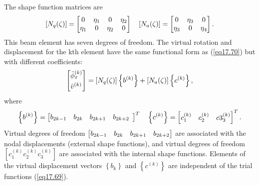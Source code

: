 \documentclass{AeroStructure-ERJohnson}
\begin{document}
The shape function matrices are
\begin{align}\label{eq17.72}
\left[N_{q}(\zeta)\right]=\left[\begin{array}{@{}cccc@{}}0 & \eta_{1} & 0 & \eta_{2} \\\eta_{1} & 0 & \eta_{2} & 0\end{array}\right] \quad\left[N_{a}(\zeta)\right]=\left[\begin{array}{@{}ccc@{}}0 & \eta_{3} & 0 \\\eta_{3} & 0 & \eta_{4}\end{array}\right].
\end{align}
This beam element has seven degrees of freedom. The virtual rotation and displacement for the kth element have the same functional form as (\ref{eq17.70}) but with different coefficients:
\begin{align}\label{eq17.73}
\left[\begin{array}{@{}l@{}}\bar{\phi}_{x}^{(k)} \\[3pt]\bar{v}^{(k)}\end{array}\right]=\left[N_{q}(\zeta)\right]\left\{b^{(k)}\right\}+\left[N_{a}(\zeta)\right]\left\{c^{(k)}\right\},
\end{align}
where
\begin{align}\label{eq17.74}
\left\{b^{(k)}\right\}=\left[\begin{array}{@{}lllll@{}}b_{2 k-1} & b_{2 k} & b_{2 k+1} & b_{2 k+2}\end{array}\right]^{T} \quad\left\{c^{(k)}\right\}=\left[\begin{array}{@{}lll@{}}c_{1}^{(k)} & c_{2}^{(k)} & c 3_{3}^{(k)}\end{array}\right]^{T}.
\end{align}
Virtual degrees of freedom $\left[\begin{array}{@{}llll@{}}b_{2 k-1} & b_{2 k} & b_{2 k+1} & b_{2 k+2}\end{array}\right]$ are associated with the nodal displacements (external shape functions), and virtual degrees of freedom $\left[c_{1}^{(k)} c_{2}^{(k)} c_{3}^{(k)}\right]$ are associated with the internal shape functions. Elements of the virtual displacement vectors $\left\{b_{k}\right\}$ and $\left\{c^{(k)}\right\}$ are independent of the trial functions (\ref{eq17.69}).
\end{document}
